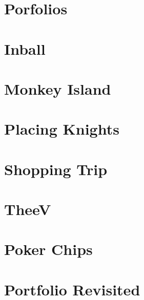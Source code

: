 \documentclass[a4paper, 10pt]{article}
\let\stdsection\section
\renewcommand\section{\newpage\stdsection}
\newcommand{\includecode}[1]{
    }
\newcommand{\algoAuthor}{2} %
\begin{document}
    \section{Porfolios}
        \includecode{../problems/w08/Portfolios/Portfolios\algoAuthor.cpp}
    
    \section{Inball}
        \includecode{../problems/w08/Inball/Inball\algoAuthor.cpp}
    
    
    \section{Monkey Island}
        \includecode{../problems/w09/Monkey_Island/MonkeyIsland\algoAuthor.cpp}
        
    \section{Placing Knights}
        \includecode{../problems/w09/Placing_Knights/PlacingKnights\algoAuthor.cpp}
        
    \section{Shopping Trip}
        \includecode{../problems/w09/Shopping_Trip/ShoppingTrip\algoAuthor.cpp}
        
    \section{TheeV}
        \includecode{../problems/w09/TheeV/TheeV\algoAuthor.cpp}
   
    
    \section{Poker Chips}
        \includecode{../problems/w10/Poker_Chips/PokerChips\algoAuthor.cpp}
        
    \section{Portfolio Revisited}
        \includecode{../problems/w10/Portfolios_Revisited/PortfolioRevisited\algoAuthor.cpp}
        
\end{document}
